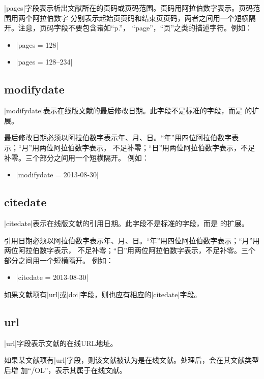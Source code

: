|pages|字段表示析出文献所在的页码或页码范围。页码用阿拉伯数字表示。页码范围用两个阿拉伯数字
分别表示起始页页码和结束页页码，两者之间用一个短横隔开。注意，页码字段不要包含诸如``p.''，
``page''，``页''之类的描述字符。例如：
\begin{itemize}
\item |pages = {128}|
\item |pages = {128--234}|
\end{itemize}

\subsection{modifydate}\label{subsec:bibfield-modifydate}

|modifydate|表示在线版文献的最后修改日期。此字段不是标准的{\BibTeX}字段，而是{\njuthesis}
的扩展。

最后修改日期必须以阿拉伯数字表示年、月、日。“年”用四位阿拉伯数字表示；“月”用两位阿拉伯数字表示，
不足补零；“日”用两位阿拉伯数字表示，不足补零。三个部分之间用一个短横隔开。
例如：
\begin{itemize}
\item |modifydate = {2013-08-30}|
\end{itemize}

\subsection{citedate}\label{subsec:bibfield-citedate}

|citedate|表示在线版文献的引用日期。此字段不是标准的{\BibTeX}字段，而是{\njuthesis}
的扩展。

引用日期必须以阿拉伯数字表示年、月、日。“年”用四位阿拉伯数字表示；“月”用两位阿拉伯数字表示，
不足补零；“日”用两位阿拉伯数字表示，不足补零。三个部分之间用一个短横隔开。
例如：
\begin{itemize}
\item |citedate = {2013-08-30}|
\end{itemize}

如果文献项有|url|或|doi|字段，则也应有相应的|citedate|字段。

\subsection{url}\label{subsec:bibfield-url}

|url|字段表示文献的在线URL地址。

如果某文献项有|url|字段，则该文献被认为是在线文献。{\BibTeX}处理后，会在其文献类型后增
加``/OL''，表示其属于在线文献。

